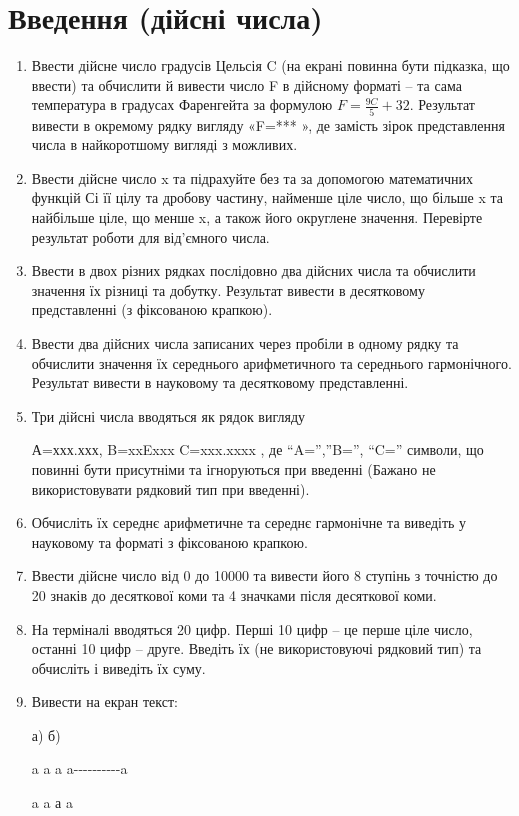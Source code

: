 \documentclass[]{article}
\begin{document}
\section{ Введення (дійсні числа)}
\begin{enumerate}
\def\labelenumi{\arabic{enumi}.}
\item
Ввести дійсне число градусів Цельсія C (на екрані повинна бути підказка,
що ввести) та обчислити й вивести число F в дійсному форматі -- та сама
температура в градусах Фаренгейта за формулою \(F = \frac{9C}{5} + 32\).
Результат вивести в окремому рядку вигляду «F=*** », де замість зірок
представлення числа в найкоротшому вигляді з можливих.
\item
Ввести дійсне число x та підрахуйте без та за допомогою математичних
функцій Сі її цілу та дробову частину, найменше ціле число, що більше x
та найбільше ціле, що менше x, а також його округлене значення.
Перевірте результат роботи для від'ємного числа.
\item
Ввести в двох різних рядках послідовно два дійсних числа та обчислити
значення їх різниці та добутку. Результат вивести в десятковому
представленні (з фіксованою крапкою).
\item
Ввести два дійсних числа записаних через пробіли в одному рядку та
обчислити значення їх середнього арифметичного та середнього
гармонічного. Результат вивести в науковому та десятковому
представленні.
\item
Три дійсні числа вводяться як рядок вигляду

А=ххх.ххх, B=xxExxx C=xxx.xxxx , де ``A='',''B='', ``C='' символи, що
повинні бути присутніми та ігноруються при введенні (Бажано не
використовувати рядковий тип при введенні).
\item
Обчисліть їх середнє арифметичне та середнє гармонічне та виведіть у
науковому та форматі з фіксованою крапкою.
\item
Ввести дійсне число від 0 до 10000 та вивести його 8 ступінь з точністю
до 20 знаків до десяткової коми та 4 значками після десяткової коми.
\item
На терміналі вводяться 20 цифр. Перші 10 цифр -- це перше ціле число,
останні 10 цифр -- друге. Введіть їх (не використовуючі рядковий тип) та
обчисліть і виведіть їх суму.
\item
Вивести на екран текст:

а) б)

a a a a-\/-\/-\/-\/-\/-\/-\/-\/-\/-a

a a а \textbar{} a \textbar{}


\end{enumerate}
\end{document}
